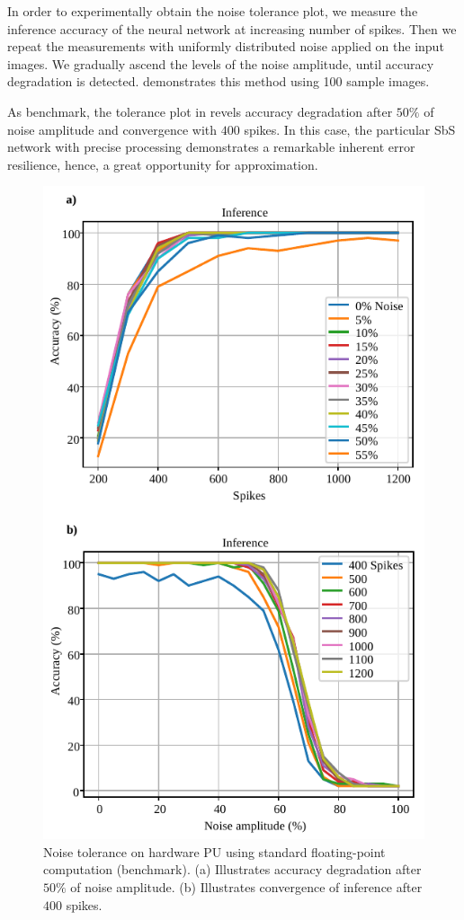 In order to experimentally obtain the noise tolerance plot, we measure the inference accuracy of the neural network at increasing number of spikes. Then we repeat the measurements with uniformly distributed noise applied on the input images. We gradually ascend the levels of the noise amplitude, until accuracy degradation is detected.  demonstrates this method using 100 sample images.

As benchmark, the tolerance plot in  revels accuracy degradation after $50\%$ of noise amplitude and convergence with $400$ spikes. In this case, the particular SbS network with precise processing demonstrates a remarkable inherent error resilience, hence, a great opportunity for approximation.


\begin{figure}[h!]
	\centering
	\includegraphics[width=1\columnwidth]{../figures/accuracy_vs_noise_pu_fp.pdf}
	\caption{Noise tolerance on hardware PU using standard floating-point computation (benchmark). (a) Illustrates accuracy degradation after $50\%$ of noise amplitude. (b) Illustrates convergence of inference after $400$ spikes.}
	\label{fig:accuracy_vs_noise_pu_fp}
\end{figure}

